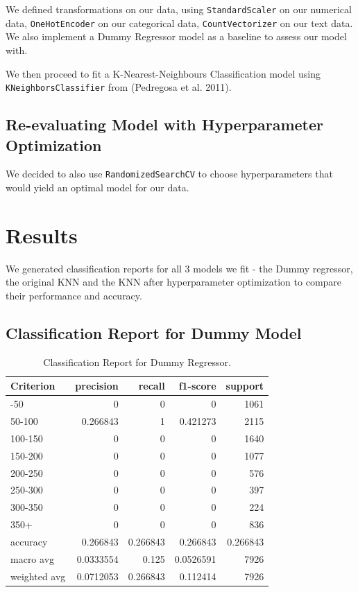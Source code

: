 \documentclass[
  letterpaper,
  DIV=11,
  numbers=noendperiod]{scrartcl}
\begin{document}
We defined transformations on our data, using \texttt{StandardScaler} on
our numerical data, \texttt{OneHotEncoder} on our categorical data,
\texttt{CountVectorizer} on our text data. We also implement a Dummy
Regressor model as a baseline to assess our model with.

We then proceed to fit a K-Nearest-Neighbours Classification model using
\texttt{KNeighborsClassifier} from (Pedregosa et al. 2011).

\subsection{Re-evaluating Model with Hyperparameter
Optimization}\label{re-evaluating-model-with-hyperparameter-optimization}

We decided to also use \texttt{RandomizedSearchCV} to choose
hyperparameters that would yield an optimal model for our data.

\section{Results}\label{results}

We generated classification reports for all 3 models we fit - the Dummy
regressor, the original KNN and the KNN after hyperparameter
optimization to compare their performance and accuracy.

\subsection{Classification Report for Dummy
Model}\label{classification-report-for-dummy-model}

\begin{longtable}[]{@{}lrrrr@{}}

\caption{\label{tbl-dummy-clf}Classification Report for Dummy
Regressor.}

\tabularnewline

\toprule\noalign{}
Criterion & precision & recall & f1-score & support \\
\midrule\noalign{}
\endhead
\bottomrule\noalign{}
\endlastfoot
0-50 & 0 & 0 & 0 & 1061 \\
50-100 & 0.266843 & 1 & 0.421273 & 2115 \\
100-150 & 0 & 0 & 0 & 1640 \\
150-200 & 0 & 0 & 0 & 1077 \\
200-250 & 0 & 0 & 0 & 576 \\
250-300 & 0 & 0 & 0 & 397 \\
300-350 & 0 & 0 & 0 & 224 \\
350+ & 0 & 0 & 0 & 836 \\
accuracy & 0.266843 & 0.266843 & 0.266843 & 0.266843 \\
macro avg & 0.0333554 & 0.125 & 0.0526591 & 7926 \\
weighted avg & 0.0712053 & 0.266843 & 0.112414 & 7926 \\

\end{longtable}
\end{document}
